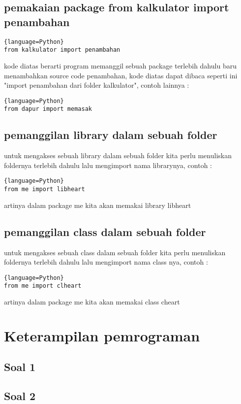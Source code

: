 \documentclass[a4paper,12pt]{report}
\begin{document}
\section{pemakaian package from kalkulator import penambahan}
\begin{lstlisting}{language=Python}
from kalkulator import penambahan
\end{lstlisting}
kode diatas berarti program memanggil sebuah package terlebih dahulu baru menambahkan source code penambahan, kode diatas dapat dibaca seperti ini "import penambahan dari folder kalkulator", contoh lainnya :
\begin{lstlisting}{language=Python}
from dapur import memasak
\end{lstlisting}
\section{pemanggilan library dalam sebuah folder}
untuk mengakses sebuah library dalam sebuah folder kita perlu menuliskan foldernya terlebih dahulu lalu mengimport nama librarynya, contoh :
\begin{lstlisting}{language=Python}
from me import libheart
\end{lstlisting}
artinya dalam package me kita akan memakai library libheart

\section{pemanggilan class dalam sebuah folder}
untuk mengakses sebuah class dalam sebuah folder kita perlu menuliskan foldernya terlebih dahulu lalu mengimport nama class nya, contoh :
\begin{lstlisting}{language=Python}
from me import clheart
\end{lstlisting}
artinya dalam package me kita akan memakai class cheart

\chapter{Keterampilan pemrograman}
\section*{Soal 1}

\section*{Soal 2}

\end{document}
